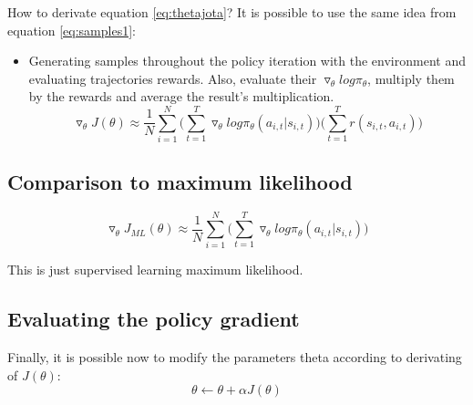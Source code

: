 \documentclass[]{article}
\begin{document}
How to derivate equation \eqref{eq:thetajota}? It is possible to use the same idea from equation \eqref{eq:samples1}:
\begin{itemize}
    \item Generating samples throughout the policy iteration with the environment and evaluating trajectories
        rewards. Also, evaluate their $\triangledown_{\theta}log\pi_{\theta}$, multiply them by the rewards and average
        the result's multiplication.
        \begin{equation}
            \label{eq:samples2}
            \triangledown_{\theta}J(\theta) \approx
            \frac{1}{N}\sum_{i=1}^{N}\Big(\sum_{t=1}^{T}\triangledown_{\theta}log\pi_{\theta}(a_{i,t}|s_{i,t})\Big)\Big(\sum_{t=1}^{T}r(s_{i,t},a_{i,t})\Big)
        \end{equation}
\end{itemize}

\subsection*{Comparison to maximum likelihood}%
\label{sub:Comparison to maximum likelihood}
\begin{equation}
    \label{eq:maximum}
    \triangledown_{\theta}J_{ML}(\theta) \approx
    \frac{1}{N}\sum_{i=1}^{N}\Big(\sum_{t=1}^{T}\triangledown_{\theta}log\pi_{\theta}(a_{i,t}|s_{i,t})\Big)
\end{equation}

This is just supervised learning maximum likelihood.

\subsection*{Evaluating the policy gradient}%
\label{sub:Evaluating the policy gradient}

Finally, it is possible now to modify the parameters theta according to derivating of $J(\theta)$:
\begin{equation}
    \label{eq:update}
    \theta \leftarrow \theta + \alpha J(\theta)
\end{equation}
\end{document}
